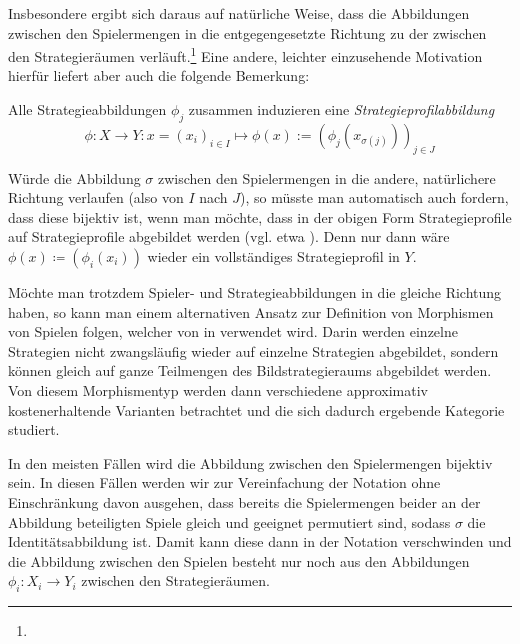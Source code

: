 Insbesondere ergibt sich daraus auf natürliche Weise, dass die Abbildungen zwischen den Spielermengen in die entgegengesetzte Richtung zu der zwischen den Strategieräumen verläuft.\footnote{} Eine andere, leichter einzusehende Motivation hierfür liefert aber auch die folgende Bemerkung:

\begin{bem}
	Alle Strategieabbildungen $\phi_j$ zusammen induzieren eine \emph{Strategieprofilabbildung}
	\[\phi: X \to Y: x=(x_i)_{i\in I} \mapsto \phi(x) := \left(\phi_j(x_{\sigma(j)})\right)_{j \in J} \]
\end{bem}

Würde die Abbildung $\sigma$ zwischen den Spielermengen in die andere, \glqq natürlichere\grqq{} Richtung verlaufen (also von $I$ nach $J$), so müsste man automatisch auch fordern, dass diese bijektiv ist, wenn man möchte, dass in der obigen Form Strategieprofile auf Strategieprofile abgebildet werden (vgl. etwa \cite{CatGameTheory}). Denn nur dann wäre $\phi(x) \coloneqq \left(\phi_i(x_i)\right)$ wieder ein vollständiges Strategieprofil in $Y$.

\begin{bem}
	Möchte man trotzdem Spieler- und Strategieabbildungen in die gleiche Richtung haben, so kann man einem alternativen Ansatz zur Definition von Morphismen von Spielen folgen, welcher von \citeauthor{Foundations} in \cite{Foundations} verwendet wird. Darin werden einzelne Strategien nicht zwangsläufig wieder auf einzelne Strategien abgebildet, sondern können gleich auf ganze Teilmengen des Bildstrategieraums abgebildet werden. Von diesem Morphismentyp werden dann verschiedene \glqq approximativ kostenerhaltende\grqq{} Varianten betrachtet und die sich dadurch ergebende Kategorie studiert.
\end{bem}

\begin{notation}
	In den meisten Fällen wird die Abbildung zwischen den Spielermengen bijektiv sein. In diesen Fällen werden wir zur Vereinfachung der Notation ohne Einschränkung davon ausgehen, dass bereits die Spielermengen beider an der Abbildung beteiligten Spiele gleich und geeignet permutiert sind, sodass $\sigma$ die Identitätsabbildung ist. Damit kann diese dann in der Notation verschwinden und die Abbildung zwischen den Spielen besteht nur noch aus den Abbildungen $\phi_i: X_i \to Y_i$ zwischen den Strategieräumen.
\end{notation}

